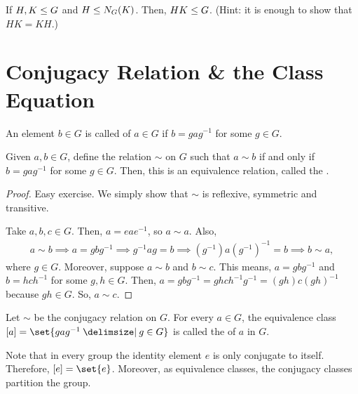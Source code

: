 \documentclass[11pt]{penrose}
\begin{document}
\begin{nex}
    If $H, K \mathrel{\leq} G$ and $H \mathrel{\leq} N_{G}(K)$. Then, $HK \mathrel{\leq} G$. (Hint: it is enough to show that $HK = KH$.)
\end{nex}


\section{Conjugacy Relation \& the Class Equation}
\begin{ndfn}
    An element $b \in G$ is called  of $a \in G$ if $b = g a g^{-1}$ for some $g \in G$.
\end{ndfn}

\begin{nthm}
    Given $a,b \in G$, define the relation $\sim$ on $G$ such that $a \sim b$ if and only if $b = g a g^{-1}$ for some $g \in G$. Then, this is an equivalence relation, called the .
\end{nthm}
\begin{proof}
    Easy exercise. We simply show that $\sim$ is reflexive, symmetric and transitive.

    Take $a, b, c \in G$. Then, $a = e a e^{-1}$, so $a \sim a$. Also,
    \begin{align*}
        a \sim b
        \implies
        a = g b g^{-1}
        \implies
        g^{-1} a g = b
        \implies
        (g^{-1}) a (g^{-1})^{-1} = b
        \implies
        b \sim a,
    \end{align*}
    where $g \in G$. Moreover, suppose $a \sim b$ and $b \sim c$. This means, $a = g b g^{-1}$ and $b = h c h^{-1}$ for some $g, h \in G$. Then, $a = g b g^{-1} = g h c h^{-1} g^{-1} = (gh) c (gh)^{-1}$ because $gh \in G$. So, $a \sim c$.
\end{proof}

\begin{ndfn}
    Let $\sim$ be the conjugacy relation on $G$. For every $a \in G$, the equivalence class $[a] = \set{ g a g^{-1} \st g \in G }$ is called the  of $a$ in $G$.
\end{ndfn}

Note that in every group the identity element $e$ is only conjugate to itself. Therefore, $[e] = \set{e}$. Moreover, as equivalence classes, the conjugacy classes partition the group.
\end{document}
